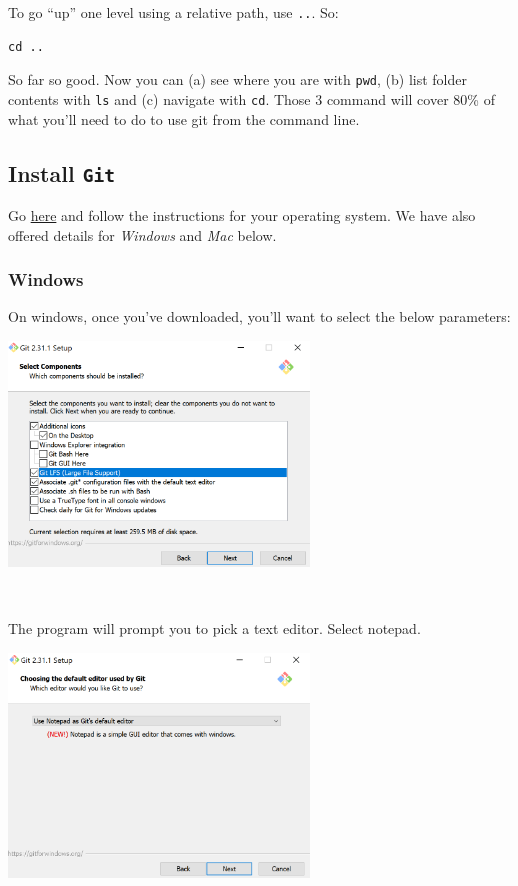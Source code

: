 \documentclass[]{book}
\begin{document}
To go ``up'' one level using a relative path, use \texttt{..}. So:

\begin{verbatim}
cd ..
\end{verbatim}

So far so good. Now you can (a) see where you are with \texttt{pwd}, (b) list folder contents with \texttt{ls} and (c) navigate with \texttt{cd}. Those 3 command will cover 80\% of what you'll need to do to use git from the command line.

\hypertarget{install-git}{%
\subsection*{\texorpdfstring{Install \texttt{Git}}{Install Git}}\label{install-git}}

Go \href{https://git-scm.com/book/en/v2/Getting-Started-Installing-Git}{here} and follow the instructions for your operating system. We have also offered details for \emph{Windows} and \emph{Mac} below.

\hypertarget{windows}{%
\subsubsection*{Windows}\label{windows}}

On windows, once you've downloaded, you'll want to select the below parameters:

\includegraphics[width=0.6\textwidth,height=\textheight]{img/git1.png}

~

The program will prompt you to pick a text editor. Select notepad.

\includegraphics[width=0.6\textwidth,height=\textheight]{img/git2.png}
\end{document}
